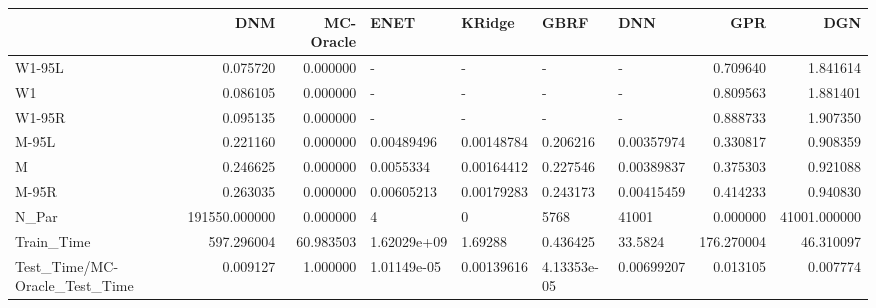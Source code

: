 \begin{tabular}{lrrllllrr}
\toprule
{} &            DNM &  MC-Oracle &         ENET &      KRidge &         GBRF &         DNN &         GPR &           DGN \\
\midrule
W1-95L                        &       0.075720 &   0.000000 &            - &           - &            - &           - &    0.709640 &      1.841614 \\
W1                            &       0.086105 &   0.000000 &            - &           - &            - &           - &    0.809563 &      1.881401 \\
W1-95R                        &       0.095135 &   0.000000 &            - &           - &            - &           - &    0.888733 &      1.907350 \\
M-95L                         &       0.221160 &   0.000000 &   0.00489496 &  0.00148784 &     0.206216 &  0.00357974 &    0.330817 &      0.908359 \\
M                             &       0.246625 &   0.000000 &    0.0055334 &  0.00164412 &     0.227546 &  0.00389837 &    0.375303 &      0.921088 \\
M-95R                         &       0.263035 &   0.000000 &   0.00605213 &  0.00179283 &     0.243173 &  0.00415459 &    0.414233 &      0.940830 \\
N\_Par                         &  191550.000000 &   0.000000 &            4 &           0 &         5768 &       41001 &    0.000000 &  41001.000000 \\
Train\_Time                    &     597.296004 &  60.983503 &  1.62029e+09 &     1.69288 &     0.436425 &     33.5824 &  176.270004 &     46.310097 \\
Test\_Time/MC-Oracle\_Test\_Time &       0.009127 &   1.000000 &  1.01149e-05 &  0.00139616 &  4.13353e-05 &  0.00699207 &    0.013105 &      0.007774 \\
\bottomrule
\end{tabular}
